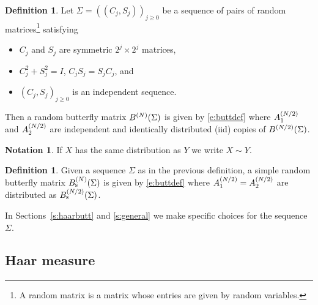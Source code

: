 \documentclass{amsart}
\theoremstyle{definition}
\newtheorem{definition}[theorem]{Definition}
\newtheorem{notation}[theorem]{Notation}
\theoremstyle{remark}
\numberwithin{equation}{section}
\begin{document}
\begin{definition}
Let $\Sigma = ( (C_j,S_j) )_{j\geq 0}$ be a sequence of pairs of random matrices\footnote{A random matrix is a matrix whose entries are given by random variables.} satisfying
\begin{itemize}
\item $C_{j}$ and $S_{j}$ are symmetric $2^{j}\times 2^{j}$ matrices,
\item $C_j^2 + S_{j}^2 = I$, $C_jS_j = S_jC_j$, and
\item $(C_j,S_j)_{j \geq 0}$ is an independent sequence.  
\end{itemize}
Then a random butterfly matrix $B^{(N)}(\Sigma)$ is given by \eqref{e:buttdef} where $A_1^{(N/2)}$ and $A_2 ^{(N/2)}$ are independent and identically distributed (iid) copies of $B^{(N/2)}(\Sigma)$. \end{definition}


\begin{notation}
If $X$ has the same distribution as $Y$ we write $X \sim Y$.
\end{notation}


\begin{definition}
Given a sequence $\Sigma$ as in the previous definition, a simple random butterfly matrix $B_\mathrm{s}^{(N)}(\Sigma)$ is given by \eqref{e:buttdef} where $A_1^{(N/2)} = A_2 ^{(N/2)}$ are distributed as $B_\mathrm{s}^{(N/2)}(\Sigma)$.
\end{definition}

In Sections~\ref{s:haarbutt} and \ref{s:general} we make specific choices for the sequence $\Sigma$.

\subsection{Haar measure}
\end{document}
